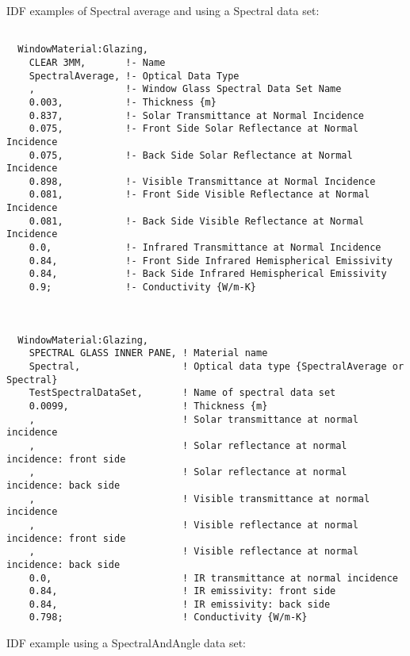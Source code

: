 IDF examples of Spectral average and using a Spectral data set:

\begin{lstlisting}

  WindowMaterial:Glazing,
    CLEAR 3MM,       !- Name
    SpectralAverage, !- Optical Data Type
    ,                !- Window Glass Spectral Data Set Name
    0.003,           !- Thickness {m}
    0.837,           !- Solar Transmittance at Normal Incidence
    0.075,           !- Front Side Solar Reflectance at Normal Incidence
    0.075,           !- Back Side Solar Reflectance at Normal Incidence
    0.898,           !- Visible Transmittance at Normal Incidence
    0.081,           !- Front Side Visible Reflectance at Normal Incidence
    0.081,           !- Back Side Visible Reflectance at Normal Incidence
    0.0,             !- Infrared Transmittance at Normal Incidence
    0.84,            !- Front Side Infrared Hemispherical Emissivity
    0.84,            !- Back Side Infrared Hemispherical Emissivity
    0.9;             !- Conductivity {W/m-K}



  WindowMaterial:Glazing,
    SPECTRAL GLASS INNER PANE, ! Material name
    Spectral,                  ! Optical data type {SpectralAverage or Spectral}
    TestSpectralDataSet,       ! Name of spectral data set
    0.0099,                    ! Thickness {m}
    ,                          ! Solar transmittance at normal incidence
    ,                          ! Solar reflectance at normal incidence: front side
    ,                          ! Solar reflectance at normal incidence: back side
    ,                          ! Visible transmittance at normal incidence
    ,                          ! Visible reflectance at normal incidence: front side
    ,                          ! Visible reflectance at normal incidence: back side
    0.0,                       ! IR transmittance at normal incidence
    0.84,                      ! IR emissivity: front side
    0.84,                      ! IR emissivity: back side
    0.798;                     ! Conductivity {W/m-K}

\end{lstlisting}

IDF example using a SpectralAndAngle data set:

